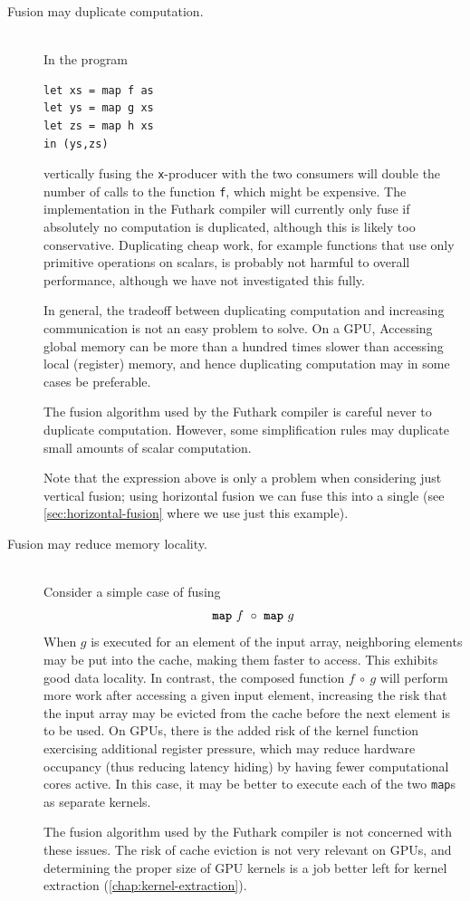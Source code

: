 \begin{description}
\item[Fusion may duplicate computation.]\hfill\\
In the program
\begin{lstlisting}
let xs = map f as
let ys = map g xs
let zs = map h xs
in (ys,zs)
\end{lstlisting}
\noindent vertically fusing the \texttt{x}-producer with the two
consumers will double the number of calls to the function \texttt{f},
which might be expensive.  The implementation in the Futhark compiler
will currently only fuse if absolutely no computation is duplicated,
although this is likely too conservative.  Duplicating cheap work, for
example functions that use only primitive operations on scalars, is
probably not harmful to overall performance, although we have not
investigated this fully.

In general, the tradeoff between duplicating computation and
increasing communication is not an easy problem to solve.  On a GPU,
Accessing global memory can be more than a hundred times slower than
accessing local (register) memory, and hence duplicating computation
may in some cases be preferable.

The fusion algorithm used by the Futhark compiler is careful never to
duplicate computation.  However, some simplification rules may
duplicate small amounts of scalar computation.

Note that the expression above is only a problem when considering just
vertical fusion; using horizontal fusion we can fuse this into a
single  (see \cref{sec:horizontal-fusion} where we use just
this example).

\item[Fusion may reduce memory locality.]\hfill\\
  Consider a simple case of fusing
  \[
    \mbox{\texttt{\bfseries{map}}}~f~\circ~\mbox{\texttt{\bfseries{map}}}~g
  \]
  When $g$ is executed for an element of the input array, neighboring
  elements may be put into the cache, making them faster to access.
  This exhibits good data locality.  In contrast, the composed
  function $f~\circ~g$ will perform more work after accessing a given
  input element, increasing the risk that the input array may be
  evicted from the cache before the next element is to be used.  On
  GPUs, there is the added risk of the kernel function exercising
  additional register pressure, which may reduce hardware occupancy
  (thus reducing latency hiding) by having fewer computational cores
  active.  In this case, it may be better to execute each of the two
  \texttt{map}s as separate kernels.

  The fusion algorithm used by the Futhark compiler is not concerned
  with these issues.  The risk of cache eviction is not very relevant
  on GPUs, and determining the proper size of GPU kernels is a job
  better left for kernel extraction (\cref{chap:kernel-extraction}).
\end{description}

